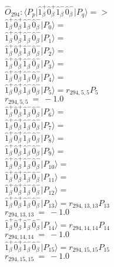 \documentclass[14pt]{article}
\begin{document}
    $\hat{O}_{294}:  \langle{P_p}\vert \hat{1}_{\beta}^{+}\hat{0}_{\beta}^{+}\hat{1}_{\beta}^{-}\hat{0}_{\beta}^{-} \vert{P_q}\rangle => $ \\ 
    $ \hat{1}_{\beta}^{+}\hat{0}_{\beta}^{+}\hat{1}_{\beta}^{-}\hat{0}_{\beta}^{-} \vert{P_{0}}\rangle =  $ \\ 
    $ \hat{1}_{\beta}^{+}\hat{0}_{\beta}^{+}\hat{1}_{\beta}^{-}\hat{0}_{\beta}^{-} \vert{P_{1}}\rangle =  $ \\ 
    $ \hat{1}_{\beta}^{+}\hat{0}_{\beta}^{+}\hat{1}_{\beta}^{-}\hat{0}_{\beta}^{-} \vert{P_{2}}\rangle =  $ \\ 
    $ \hat{1}_{\beta}^{+}\hat{0}_{\beta}^{+}\hat{1}_{\beta}^{-}\hat{0}_{\beta}^{-} \vert{P_{3}}\rangle =  $ \\ 
    $ \hat{1}_{\beta}^{+}\hat{0}_{\beta}^{+}\hat{1}_{\beta}^{-}\hat{0}_{\beta}^{-} \vert{P_{4}}\rangle =  $ \\ 
    $ \hat{1}_{\beta}^{+}\hat{0}_{\beta}^{+}\hat{1}_{\beta}^{-}\hat{0}_{\beta}^{-} \vert{P_{5}}\rangle = {r}_{294,5,5}P_{5} $ \\ 
    ${r}_{294,5,5}\ =\ -1.0 $ \\ 
    $ \hat{1}_{\beta}^{+}\hat{0}_{\beta}^{+}\hat{1}_{\beta}^{-}\hat{0}_{\beta}^{-} \vert{P_{6}}\rangle =  $ \\ 
    $ \hat{1}_{\beta}^{+}\hat{0}_{\beta}^{+}\hat{1}_{\beta}^{-}\hat{0}_{\beta}^{-} \vert{P_{7}}\rangle =  $ \\ 
    $ \hat{1}_{\beta}^{+}\hat{0}_{\beta}^{+}\hat{1}_{\beta}^{-}\hat{0}_{\beta}^{-} \vert{P_{8}}\rangle =  $ \\ 
    $ \hat{1}_{\beta}^{+}\hat{0}_{\beta}^{+}\hat{1}_{\beta}^{-}\hat{0}_{\beta}^{-} \vert{P_{9}}\rangle =  $ \\ 
    $ \hat{1}_{\beta}^{+}\hat{0}_{\beta}^{+}\hat{1}_{\beta}^{-}\hat{0}_{\beta}^{-} \vert{P_{10}}\rangle =  $ \\ 
    $ \hat{1}_{\beta}^{+}\hat{0}_{\beta}^{+}\hat{1}_{\beta}^{-}\hat{0}_{\beta}^{-} \vert{P_{11}}\rangle =  $ \\ 
    $ \hat{1}_{\beta}^{+}\hat{0}_{\beta}^{+}\hat{1}_{\beta}^{-}\hat{0}_{\beta}^{-} \vert{P_{12}}\rangle =  $ \\ 
    $ \hat{1}_{\beta}^{+}\hat{0}_{\beta}^{+}\hat{1}_{\beta}^{-}\hat{0}_{\beta}^{-} \vert{P_{13}}\rangle = {r}_{294,13,13}P_{13} $ \\ 
    ${r}_{294,13,13}\ =\ -1.0 $ \\ 
    $ \hat{1}_{\beta}^{+}\hat{0}_{\beta}^{+}\hat{1}_{\beta}^{-}\hat{0}_{\beta}^{-} \vert{P_{14}}\rangle = {r}_{294,14,14}P_{14} $ \\ 
    ${r}_{294,14,14}\ =\ -1.0 $ \\ 
    $ \hat{1}_{\beta}^{+}\hat{0}_{\beta}^{+}\hat{1}_{\beta}^{-}\hat{0}_{\beta}^{-} \vert{P_{15}}\rangle = {r}_{294,15,15}P_{15} $ \\ 
    ${r}_{294,15,15}\ =\ -1.0 $ \\ 
    
\end{document}
